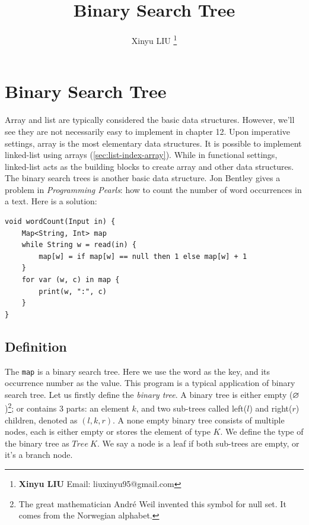 \documentclass[b5paper]{article}
\begin{document}
\title{Binary Search Tree}

\author{Xinyu LIU
\thanks{{\bfseries Xinyu LIU} \newline
  Email: liuxinyu95@gmail.com \newline}
  }

\maketitle
\fi


\ifx\wholebook\relax
\chapter{Binary Search Tree}
\fi

Array and list are typically considered the basic data structures. However, we'll see they are not necessarily easy to implement in chapter 12. Upon imperative settings, array is the most elementary data structures. It is possible to implement linked-list using arrays (\cref{sec:list-index-array}). While in functional settings, linked-list acts as the building blocks to create array and other data structures. The binary search trees is another basic data structure. Jon Bentley gives a problem in {\em Programming Pearls}\cite{Bentley}: how to count the number of word occurrences in a text. Here is a solution:

\lstset{frame=single}
\begin{lstlisting}[language=Bourbaki]
void wordCount(Input in) {
    Map<String, Int> map
    while String w = read(in) {
        map[w] = if map[w] == null then 1 else map[w] + 1
    }
    for var (w, c) in map {
        print(w, ":", c)
    }
}
\end{lstlisting}

\section{Definition}
\label{introduction} 

The \texttt{map} is a binary search tree. Here we use the word as the key, and its occurrence number as the value. This program is a typical application of binary search tree. Let us firstly define the {\em binary tree}. A binary tree is either empty ($\varnothing$)\footnote{The great mathematician André Weil invented this symbol for null set. It comes from the Norwegian alphabet.}; or contains 3 parts: an element $k$, and two sub-trees called left($l$) and right($r$) children, denoted as $(l, k, r)$. A none empty binary tree consists of multiple nodes, each is either empty or stores the element of type $K$. We define the type of the binary tree as $Tree\ K$. We say a node is a leaf if both sub-trees are empty, or it's a branch node.
\end{document}
